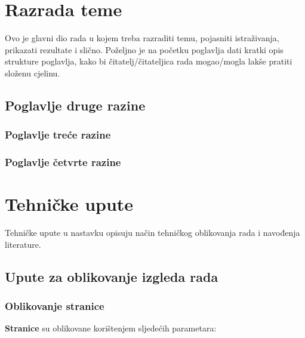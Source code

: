 \documentclass[]{foi}
\begin{document}
\chapter{Razrada teme}

Ovo je glavni dio rada u kojem treba razraditi temu, pojasniti istraživanja, prikazati rezultate i slično. Poželjno je na početku poglavlja dati kratki opis strukture poglavlja, kako bi čitatelj/čitateljica rada mogao/mogla lakše pratiti složenu cjelinu.



\section{Poglavlje druge razine }

\lipsum[6]



\subsection{Poglavlje treće razine}

\lipsum[2]



\subsection{Poglavlje četvrte razine}

\lipsum[4-5]



\chapter{Tehničke upute}

Tehničke upute u nastavku opisuju način tehničkog oblikovanja rada i navođenja literature.



\section{Upute za oblikovanje izgleda rada}

\subsection{Oblikovanje stranice}

\textbf{Stranice} su oblikovane korištenjem sljedećih parametara:
\end{document}

